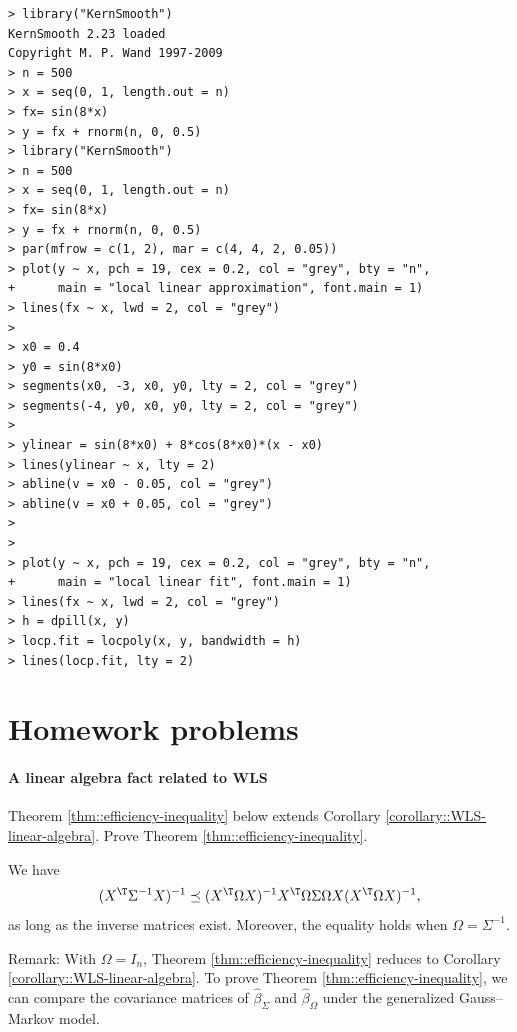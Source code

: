 \begin{lstlisting}
> library("KernSmooth")
KernSmooth 2.23 loaded
Copyright M. P. Wand 1997-2009
> n = 500
> x = seq(0, 1, length.out = n)
> fx= sin(8*x)
> y = fx + rnorm(n, 0, 0.5)
> library("KernSmooth")
> n = 500
> x = seq(0, 1, length.out = n)
> fx= sin(8*x)
> y = fx + rnorm(n, 0, 0.5)
> par(mfrow = c(1, 2), mar = c(4, 4, 2, 0.05))
> plot(y ~ x, pch = 19, cex = 0.2, col = "grey", bty = "n",
+      main = "local linear approximation", font.main = 1)
> lines(fx ~ x, lwd = 2, col = "grey")
> 
> x0 = 0.4
> y0 = sin(8*x0)
> segments(x0, -3, x0, y0, lty = 2, col = "grey")
> segments(-4, y0, x0, y0, lty = 2, col = "grey")
> 
> ylinear = sin(8*x0) + 8*cos(8*x0)*(x - x0)
> lines(ylinear ~ x, lty = 2)
> abline(v = x0 - 0.05, col = "grey")
> abline(v = x0 + 0.05, col = "grey")
> 
> 
> plot(y ~ x, pch = 19, cex = 0.2, col = "grey", bty = "n",
+      main = "local linear fit", font.main = 1)
> lines(fx ~ x, lwd = 2, col = "grey")
> h = dpill(x, y)
> locp.fit = locpoly(x, y, bandwidth = h)
> lines(locp.fit, lty = 2)
\end{lstlisting}



 

\section{Homework problems}
\label{sec::homework-problems}
 
 
\paragraph{A linear algebra fact related to WLS}\label{hw16::linear-algebra-wls} 
 
Theorem \ref{thm::efficiency-inequality} below extends Corollary \ref{corollary::WLS-linear-algebra}. Prove Theorem \ref{thm::efficiency-inequality}. 


\begin{theorem}
\label{thm::efficiency-inequality}
We have 
$$
(X^{\T}  \Sigma^{-1}  X) ^{-1} 
\preceq
(X^{\T}  \Omega  X)^{-1}X^{\T}   \Omega  \Sigma   \Omega X(X^{\T}   \Omega  X)^{-1},
$$
as long as the inverse matrices exist. Moreover, the equality holds when $ \Omega = \Sigma^{-1}$. 
\end{theorem}


Remark: With $\Omega = I_n$, Theorem \ref{thm::efficiency-inequality} reduces to Corollary \ref{corollary::WLS-linear-algebra}. To prove Theorem \ref{thm::efficiency-inequality}, we can compare the covariance matrices of $\hat{\beta}_{\Sigma}$ and $\hat{\beta}_{\Omega}$ under the generalized Gauss--Markov model. 

